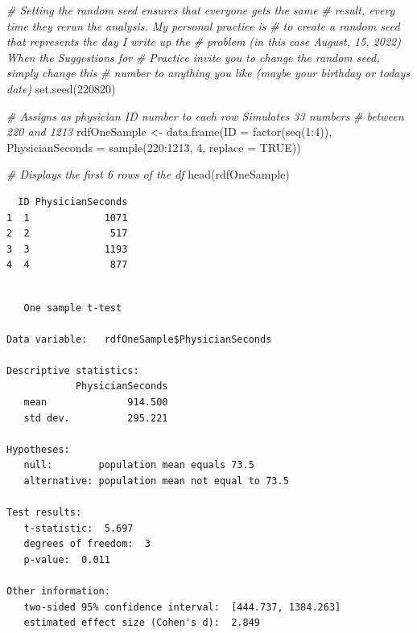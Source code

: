 \documentclass[
  11pt,
]{book}
\newenvironment{Shaded}{\begin{snugshade}}{\end{snugshade}}
\newcommand{\AttributeTok}[1]{\textcolor[rgb]{0.77,0.63,0.00}{#1}}
\newcommand{\CommentTok}[1]{\textcolor[rgb]{0.56,0.35,0.01}{\textit{#1}}}
\newcommand{\ConstantTok}[1]{\textcolor[rgb]{0.00,0.00,0.00}{#1}}
\newcommand{\DecValTok}[1]{\textcolor[rgb]{0.00,0.00,0.81}{#1}}
\newcommand{\FloatTok}[1]{\textcolor[rgb]{0.00,0.00,0.81}{#1}}
\newcommand{\FunctionTok}[1]{\textcolor[rgb]{0.00,0.00,0.00}{#1}}
\newcommand{\NormalTok}[1]{#1}
\newcommand{\OtherTok}[1]{\textcolor[rgb]{0.56,0.35,0.01}{#1}}
\newcommand{\SpecialCharTok}[1]{\textcolor[rgb]{0.00,0.00,0.00}{#1}}
\begin{document}
\begin{Shaded}
\begin{Highlighting}[]
\CommentTok{\# Setting the \textquotesingle{}random\textquotesingle{} seed ensures that everyone gets the same}
\CommentTok{\# result, every time they rerun the analysis. My personal practice is}
\CommentTok{\# to create a random seed that represents the day I write up the}
\CommentTok{\# problem (in this case August, 15, 2022) When the Suggestions for}
\CommentTok{\# Practice invite you to \textquotesingle{}change the random seed,\textquotesingle{} simply change this}
\CommentTok{\# number to anything you like (maybe your birthday or today\textquotesingle{}s date)}
\FunctionTok{set.seed}\NormalTok{(}\DecValTok{220820}\NormalTok{)}

\CommentTok{\# Assigns as physician ID number to each row Simulates 33 numbers}
\CommentTok{\# between 220 and 1213}
\NormalTok{rdfOneSample }\OtherTok{\textless{}{-}} \FunctionTok{data.frame}\NormalTok{(}\AttributeTok{ID =} \FunctionTok{factor}\NormalTok{(}\FunctionTok{seq}\NormalTok{(}\DecValTok{1}\SpecialCharTok{:}\DecValTok{4}\NormalTok{)), }\AttributeTok{PhysicianSeconds =} \FunctionTok{sample}\NormalTok{(}\DecValTok{220}\SpecialCharTok{:}\DecValTok{1213}\NormalTok{,}
    \DecValTok{4}\NormalTok{, }\AttributeTok{replace =} \ConstantTok{TRUE}\NormalTok{))}

\CommentTok{\# Displays the first 6 rows of the df}
\FunctionTok{head}\NormalTok{(rdfOneSample)}
\end{Highlighting}
\end{Shaded}

\begin{verbatim}
  ID PhysicianSeconds
1  1             1071
2  2              517
3  3             1193
4  4              877
\end{verbatim}

\begin{Shaded}
\end{Shaded}

\begin{verbatim}

   One sample t-test 

Data variable:   rdfOneSample$PhysicianSeconds 

Descriptive statistics: 
            PhysicianSeconds
   mean              914.500
   std dev.          295.221

Hypotheses: 
   null:        population mean equals 73.5 
   alternative: population mean not equal to 73.5 

Test results: 
   t-statistic:  5.697 
   degrees of freedom:  3 
   p-value:  0.011 

Other information: 
   two-sided 95% confidence interval:  [444.737, 1384.263] 
   estimated effect size (Cohen's d):  2.849 
\end{verbatim}
\end{document}
